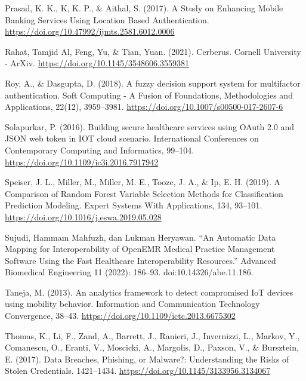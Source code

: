 \begin{thebibliography}{99}
    Prasad, K. K., K, K. P., \& Aithal, S. (2017). A Study on Enhancing Mobile Banking Services Using Location Based Authentication. \url{https://doi.org/10.47992/ijmts.2581.6012.0006}
    
    Rahat, Tamjid Al, Feng, Yu, \& Tian, Yuan. (2021). Cerberus. Cornell University - ArXiv. \url{https://doi.org/10.1145/3548606.3559381}
    
    Roy, A., \& Dasgupta, D. (2018). A fuzzy decision support system for multifactor authentication. Soft Computing - A Fusion of Foundations, Methodologies and Applications, 22(12), 3959–3981. \url{https://doi.org/10.1007/s00500-017-2607-6}
    
    Solapurkar, P. (2016). Building secure healthcare services using OAuth 2.0 and JSON web token in IOT cloud scenario. International Conferences on Contemporary Computing and Informatics, 99–104. \url{https://doi.org/10.1109/ic3i.2016.7917942}
    
    Speiser, J. L., Miller, M., Miller, M. E., Tooze, J. A., \& Ip, E. H. (2019). A Comparison of Random Forest Variable Selection Methods for Classification Prediction Modeling. Expert Systems With Applications, 134, 93–101. \url{https://doi.org/10.1016/j.eswa.2019.05.028}
    
    Sujudi, Hammam Mahfuzh, dan Lukman Heryawan. “An Automatic Data Mapping for Interoperability of OpenEMR Medical Practice Management Software Using the Fast Healthcare Interoperability Resources.” Advanced Biomedical Engineering 11 (2022): 186–93. doi:10.14326/abe.11.186.
    
    Taneja, M. (2013). An analytics framework to detect compromised IoT devices using mobility behavior. Information and Communication Technology Convergence, 38–43. \url{https://doi.org/10.1109/ictc.2013.6675302}
    
    Thomas, K., Li, F., Zand, A., Barrett, J., Ranieri, J., Invernizzi, L., Markov, Y., Comanescu, O., Eranti, V., Moscicki, A., Margolis, D., Paxson, V., \& Bursztein, E. (2017). Data Breaches, Phishing, or Malware?: Understanding the Risks of Stolen Credentials. 1421–1434. \url{https://doi.org/10.1145/3133956.3134067}
    

\end{thebibliography}
